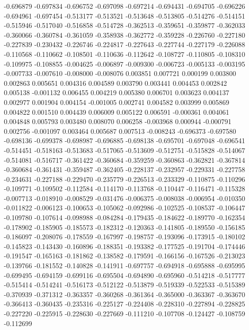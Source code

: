 -0.696879
-0.697834
-0.696752
-0.697098
-0.697214
-0.694431
-0.694705
-0.696226
-0.694961
-0.697454
-0.513177
-0.513521
-0.513648
-0.513805
-0.514276
-0.514151
-0.515946
-0.517040
-0.516858
-0.514728
-0.362513
-0.359651
-0.359877
-0.362033
-0.360066
-0.360784
-0.361059
-0.358938
-0.362772
-0.359228
-0.226760
-0.227180
-0.227839
-0.230432
-0.226746
-0.224817
-0.227643
-0.227744
-0.227179
-0.226088
-0.110568
-0.110662
-0.108501
-0.110636
-0.112642
-0.108727
-0.110805
-0.108310
-0.109975
-0.108855
-0.004625
-0.006897
-0.009300
-0.006723
-0.005133
-0.003195
-0.007733
-0.007610
-0.008000
-0.008076
0.003851
0.007721
0.000199
0.003800
0.002863
0.005651
0.004316
0.004589
0.003790
0.003441
0.004453
0.002842
0.005138
-0.001132
0.006455
0.004219
0.005380
0.006701
0.003623
0.004137
0.002977
0.001904
0.004154
-0.001005
0.002741
0.004582
0.003999
0.005869
0.004822
0.001510
0.004439
0.006009
0.005122
0.006591
-0.000361
0.004061
0.004848
0.005793
0.003480
0.008070
0.006258
-0.003968
0.000944
-0.000791
0.002756
-0.001097
0.003464
0.005687
0.007513
-0.008243
-0.696373
-0.697580
-0.698136
-0.699378
-0.698987
-0.696885
-0.698138
-0.695701
-0.697048
-0.696541
-0.514451
-0.518163
-0.513683
-0.517065
-0.513609
-0.512751
-0.515828
-0.514067
-0.514081
-0.516717
-0.361422
-0.360684
-0.359259
-0.360863
-0.362821
-0.367814
-0.360684
-0.361431
-0.359487
-0.362405
-0.228137
-0.232957
-0.229331
-0.227758
-0.234631
-0.227188
-0.229470
-0.235779
-0.226513
-0.233329
-0.110875
-0.110296
-0.109771
-0.109502
-0.112584
-0.114170
-0.113768
-0.110447
-0.116471
-0.115328
-0.007713
-0.018910
-0.008529
-0.031476
-0.006375
-0.008038
-0.006954
-0.010350
-0.011822
-0.006123
-0.100653
-0.105062
-0.092986
-0.102525
-0.108537
-0.106447
-0.109780
-0.107614
-0.098988
-0.084284
-0.179435
-0.184622
-0.189770
-0.162354
-0.178902
-0.185905
-0.185573
-0.182312
-0.120363
-0.141805
-0.189550
-0.156185
-0.186097
-0.208076
-0.178559
-0.167997
-0.198757
-0.193096
-0.173915
-0.180102
-0.145823
-0.143430
-0.160896
-0.188351
-0.193382
-0.177525
-0.191704
-0.174446
-0.191547
-0.165163
-0.181862
-0.138582
-0.179591
-0.166156
-0.167526
-0.213023
-0.139766
-0.181552
-0.140828
-0.141911
-0.697757
-0.694918
-0.695888
-0.695995
-0.699495
-0.694159
-0.699116
-0.695504
-0.694890
-0.695960
-0.514218
-0.517777
-0.515414
-0.514241
-0.516173
-0.512122
-0.513879
-0.519339
-0.522533
-0.515389
-0.370939
-0.371312
-0.363357
-0.360268
-0.361364
-0.365000
-0.363367
-0.363670
-0.366413
-0.360435
-0.235316
-0.225127
-0.224408
-0.228310
-0.227894
-0.228825
-0.227220
-0.225915
-0.228630
-0.227669
-0.111210
-0.107708
-0.124427
-0.108759
-0.112699
